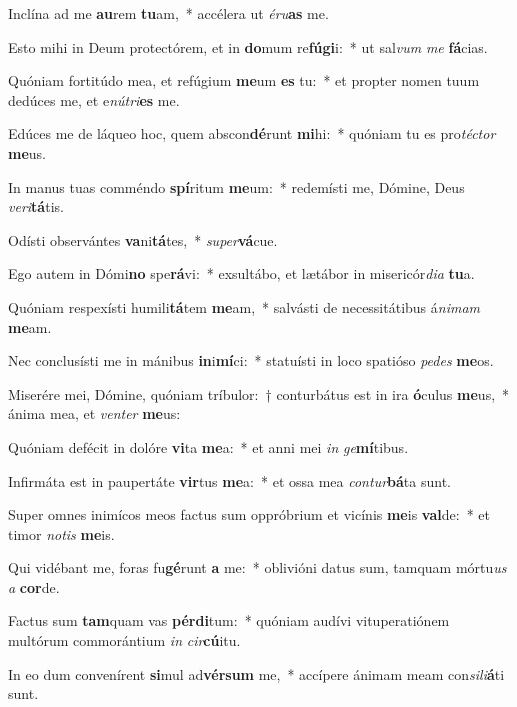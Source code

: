 \item Inclína ad me \textbf{au}rem \textbf{tu}am,~* accélera ut \textit{é}\textit{ru}\textbf{as} me.
\item Esto mihi in Deum protectórem, et in \textbf{do}mum re\textbf{fú}\textbf{gi}i:~* ut sal\textit{vum} \textit{me} \textbf{fá}cias.
\item Quóniam fortitúdo mea, et refúgium \textbf{me}um \textbf{es} tu:~* et propter nomen tuum dedúces me, et e\textit{nú}\textit{tri}\textbf{es} me.
\item Edúces me de láqueo hoc, quem abscon\textbf{dé}runt \textbf{mi}hi:~* quóniam tu es pro\textit{téc}\textit{tor} \textbf{me}us.
\item In manus tuas comméndo \textbf{spí}ritum \textbf{me}um:~* redemísti me, Dómine, Deus \textit{ve}\textit{ri}\textbf{tá}tis.
\item Odísti observántes \textbf{va}ni\textbf{tá}tes,~* \textit{su}\textit{per}\textbf{vá}cue.
\item Ego autem in Dómi\textbf{no} spe\textbf{rá}vi:~* exsultábo, et lætábor in misericór\textit{di}\textit{a} \textbf{tu}a.
\item Quóniam respexísti humili\textbf{tá}tem \textbf{me}am,~* salvásti de necessitátibus á\textit{ni}\textit{mam} \textbf{me}am.
\item Nec conclusísti me in mánibus \textbf{in}i\textbf{mí}ci:~* statuísti in loco spatióso \textit{pe}\textit{des} \textbf{me}os.
\item Miserére mei, Dómine, quóniam tríbulor:~† conturbátus est in ira \textbf{ó}culus \textbf{me}us,~* ánima mea, et \textit{ven}\textit{ter} \textbf{me}us:
\item Quóniam defécit in dolóre \textbf{vi}ta \textbf{me}a:~* et anni mei \textit{in} \textit{ge}\textbf{mí}tibus.
\item Infirmáta est in paupertáte \textbf{vir}tus \textbf{me}a:~* et ossa mea \textit{con}\textit{tur}\textbf{bá}ta sunt.
\item Super omnes inimícos meos factus sum oppróbrium et vicínis \textbf{me}is \textbf{val}de:~* et timor \textit{no}\textit{tis} \textbf{me}is.
\item Qui vidébant me, foras fu\textbf{gé}runt \textbf{a} me:~* oblivióni datus sum, tamquam mórtu\textit{us} \textit{a} \textbf{cor}de.
\item Factus sum \textbf{tam}quam vas \textbf{pér}\textbf{di}tum:~* quóniam audívi vituperatiónem multórum commorántium \textit{in} \textit{cir}\textbf{cú}itu.
\item In eo dum convenírent \textbf{si}mul ad\textbf{vér}\textbf{sum} me,~* accípere ánimam meam con\textit{si}\textit{li}\textbf{á}ti sunt.
